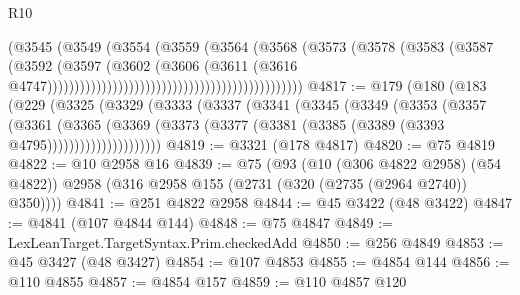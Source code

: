 \begin{lexlean}{R10}
\begin{coremodule}
                                                                  (@3545
                                                                    (@3549
                                                                      (@3554
                                                                        (@3559
                                                                          (@3564
                                                                            (@3568
                                                                              (@3573
                                                                                (@3578
                                                                                  (@3583
                                                                                    (@3587
                                                                                      (@3592
                                                                                        (@3597
                                                                                          (@3602
                                                                                            (@3606
                                                                                              (@3611
                                                                                                (@3616
                                                                                                  @4747)))))))))))))))))))))))))))))))))))))))))))))))
@4817 := @179
    (@180
      (@183
        (@229
          (@3325
            (@3329
              (@3333
                (@3337
                  (@3341
                    (@3345
                      (@3349
                        (@3353
                          (@3357
                            (@3361
                              (@3365
                                (@3369
                                  (@3373
                                    (@3377 (@3381 (@3385 (@3389 (@3393 @4795)))))))))))))))))))))
@4819 := @3321 (@178 @4817)
@4820 := @75 @4819
@4822 := @10 @2958 @16
@4839 := @75
    (@93
      (@10 (@306 @4822 @2958) (@54 @4822))
      @2958
      (@316 @2958 @155 (@2731 (@320 (@2735 (@2964 @2740)) @350))))
@4841 := @251 @4822 @2958
@4844 := @45 @3422 (@48 @3422)
@4847 := @4841 (@107 @4844 @144)
@4848 := @75 @4847
@4849 := LexLeanTarget.TargetSyntax.Prim.checkedAdd
@4850 := @256 @4849
@4853 := @45 @3427 (@48 @3427)
@4854 := @107 @4853
@4855 := @4854 @144
@4856 := @110 @4855
@4857 := @4854 @157
@4859 := @110 @4857 @120

\end{coremodule}
\end{lexlean}
